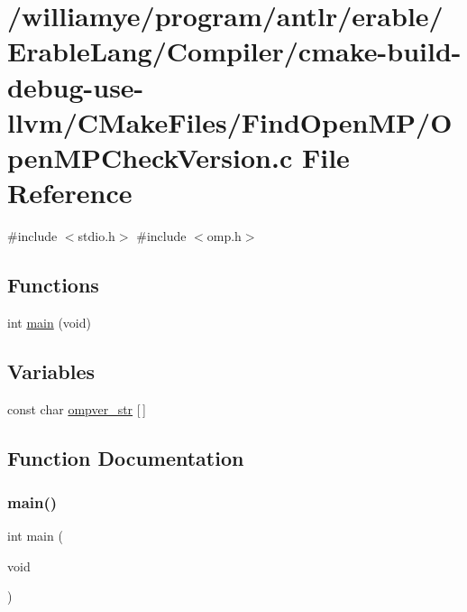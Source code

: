 \hypertarget{use-llvm_2_c_make_files_2_find_open_m_p_2_open_m_p_check_version_8c}{}\section{/williamye/program/antlr/erable/\+Erable\+Lang/\+Compiler/cmake-\/build-\/debug-\/use-\/llvm/\+C\+Make\+Files/\+Find\+Open\+M\+P/\+Open\+M\+P\+Check\+Version.c File Reference}
\label{use-llvm_2_c_make_files_2_find_open_m_p_2_open_m_p_check_version_8c}
{\ttfamily \#include $<$stdio.\+h$>$}\newline
{\ttfamily \#include $<$omp.\+h$>$}\newline
\subsection*{Functions}
\begin{DoxyCompactItemize}
\item 
int \mbox{\hyperlink{use-llvm_2_c_make_files_2_find_open_m_p_2_open_m_p_check_version_8c_a840291bc02cba5474a4cb46a9b9566fe}{main}} (void)
\end{DoxyCompactItemize}
\subsection*{Variables}
\begin{DoxyCompactItemize}
\item 
const char \mbox{\hyperlink{use-llvm_2_c_make_files_2_find_open_m_p_2_open_m_p_check_version_8c_af60b110d3c4507a1d6ffd66d846f1c58}{ompver\+\_\+str}} \mbox{[}$\,$\mbox{]}
\end{DoxyCompactItemize}


\subsection{Function Documentation}
\mbox{\label{use-llvm_2_c_make_files_2_find_open_m_p_2_open_m_p_check_version_8c_a840291bc02cba5474a4cb46a9b9566fe}} 
\subsubsection{\texorpdfstring{main()}{main()}}
{\footnotesize\ttfamily int main (\begin{DoxyParamCaption}\item[{void}]{ }\end{DoxyParamCaption})}



